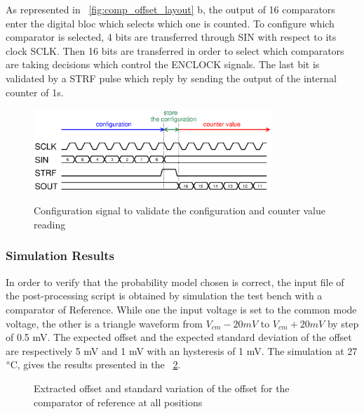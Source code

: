 As represented in \figurename~\ref{fig:comp_offset_layout} b, the output of 16 comparators enter the digital bloc which selects which one is counted. To configure which comparator is selected, 4 bits are transferred through SIN with respect to its clock SCLK\@. Then 16 bits are transferred in order to select which comparators are taking decisions which control the ENCLOCK signals. The last bit is validated by a STRF pulse which reply by sending the output of the internal counter of 1s.

\begin{figure}[htp]
    \centering
    \includegraphics[width=0.8\textwidth]{Chapter5/Figs/comp_test/configuration-patternc.ps}
    \label{fig:test-comp-pattern-c-config}
    \caption{Configuration signal to validate the configuration and counter value reading}
\end{figure}

\subsubsection{Simulation Results}
In order to verify that the probability model chosen is correct, the input file of the post-processing script is obtained by simulation the test bench with a comparator of Reference. While one the input voltage is set to the common mode voltage, the other is a triangle waveform from $V_{cm}-20 mV$ to $V_{cm}+20 mV$ by step of 0.5 mV. The expected offset and the expected standard deviation of the offset are respectively 5 mV and 1 mV with an hysteresis of 1 mV. The simulation at 27$\degree$C, gives the results presented in the \figurename~\ref{fig:offset_conv_verif}.

\begin{figure}[htp]
    \centering
    \begin{subfigure}[b]{0.32\textwidth}
    \end{subfigure}
    \begin{subfigure}[b]{0.32\textwidth}
    \end{subfigure}
    \begin{subfigure}[b]{0.32\textwidth}
    \end{subfigure}
    \caption{Extracted offset and standard variation of the offset for the comparator of reference at all positions}
    \label{fig:offset_conv_verif}
\end{figure}

